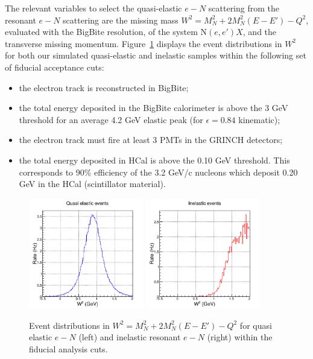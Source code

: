 The relevant variables to select the quasi-elastic $e-N$ scattering from the resonant $e-N$ scattering are the missing mass $W^2 = M_{N}^2+2M_{N}^{2}(E-E')-Q^2$, evaluated with the BigBite resolution, of the system N$(e, e')X$, and the transverse missing momentum.
Figure~\ref{fig:W2} displays the event distributions in $W^2$ for both our simulated quasi-elastic and inelastic samples within the following set of fiducial acceptance cuts:
%
\begin{itemize}
\item{the electron track is reconstructed in BigBite;}
\item{the total energy deposited in the BigBite calorimeter is above the 3 GeV threshold for an average 4.2 GeV elastic peak (for $\epsilon = 0.84$ kinematic);}
\item{the electron track must fire at least 3 PMTs in the GRINCH detectors;}
\item{the total energy deposited in HCal is above the 0.10 GeV threshold. This corresponds to 90\% efficiency of the 3.2 GeV/c nucleons which deposit 0.20 GeV in the HCal (scintillator material).}
\end{itemize}
%
%
\begin{figure}[h]
  \centering
    \includegraphics[width=5cm]{Answers_Readers/W2_sig.pdf}
    \includegraphics[width=5cm]{Answers_Readers/W2_inel.pdf}
    \caption{Event distributions in $W^2 = M_{N}^2+2M_{N}^{2}(E-E')-Q^2$  for quasi elastic $e-N$ (left) and inelastic resonant $e-N$ (right) within the fiducial analysis cuts.}
    \label{fig:W2}
\end{figure}
%

